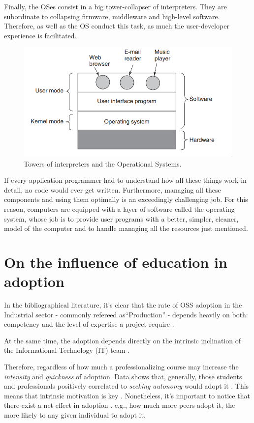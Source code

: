 \documentclass[
12pt,				%
openright,			%
oneside,			%
a4paper,			%
brazil,				%
english,			%
]{abntex2}
\begin{document}
Finally, the OSes consist in a big tower-collapser of
interpreters. They are subordinate to collapsing firmware, middleware
and high-level software. Therefore, as well as the OS conduct this task,
as much the user-developer experience is facilitated.

\begin{figure}[ht]
  \centering
 \caption{\label{fig:os} Towers of interpreters and the Operational Systems.}
  \includegraphics[width=0.5\linewidth]{tower-os.png}
\end{figure}

\begin{citacao}
If every application programmer had to understand how all these things work in detail, no code would ever
get written. Furthermore, managing all these components and using them optimally
is an exceedingly challenging job. For this reason, computers are equipped with a
layer of software called the operating system, whose job is to provide
user programs with a better, simpler, cleaner, model of the computer
and to handle managing all the resources just mentioned. \cite{tanenbaum2015modern}
\end{citacao}

\section{On the influence of education in adoption}

In the bibliographical literature, it's clear that the rate of OSS adoption in the Industrial sector - commonly refereed as``Production'' - depends heavily on both: competency and the level of expertise a project require \cite{li2013all,gallego2015open,spinellis2012organizational}.

At the same time, the adoption depends directly on the intrinsic inclination of the Informational Technology (IT) team \cite{racero2021can}. 

Therefore, regardless of how much a professionalizing course may increase the \textit{intensity} and \textit{quickness} of adoption. Data shows that, generally, those students and professionals positively correlated to \textit{seeking autonomy} would adopt it \cite{racero2020predicting}. This means that intrinsic motivation is key \cite{gallego2015open}. Nonetheless, it's important to notice that there exist a net-effect in adoption \cite{spinellis2012organizational}. e.g., how much more peers adopt it, the more likely to any given individual to adopt it.      
\end{document}
